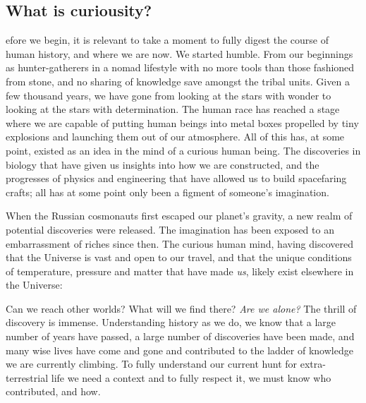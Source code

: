 \subsection{What is curiousity?}
efore we begin, it is relevant to take a moment to fully digest the course of human history, and where we are now.
We started humble.
From our beginnings as hunter-gatherers in a nomad lifestyle with no more tools than those fashioned from stone, and no sharing of knowledge save amongst the tribal units.
Given a few thousand years, we have gone from looking at the stars with wonder to looking at the stars with determination.
The human race has reached a stage where we are capable of putting human beings into metal boxes propelled by tiny explosions and launching them out of our atmosphere.
All of this has, at some point, existed as an idea in the mind of a curious human being.
The discoveries in biology that have given us insights into how we are constructed, and the progresses of physics and engineering that have allowed us to build spacefaring crafts; all has at some point only been a figment of someone's imagination.

When the Russian cosmonauts first escaped our planet's gravity, a new realm of potential discoveries were released.
The imagination has been exposed to an embarrassment of riches since then.
The curious human mind, having discovered that the Universe is vast and open to our travel, and that the unique conditions of temperature, pressure and matter that have made \textit{us}, likely exist elsewhere in the Universe:

Can we reach other worlds?
What will we find there?
\textit{Are we alone?}
The thrill of discovery is immense.
Understanding history as we do, we know that a large number of years have passed, a large number of discoveries have been made, and many wise lives have come and gone and contributed to the ladder of knowledge we are currently climbing.
To fully understand our current hunt for extra-terrestrial life we need a context and to fully respect it, we must know who contributed, and how.